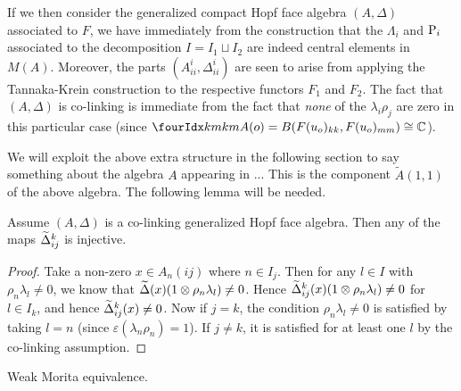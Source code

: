 If we then consider the generalized compact Hopf face algebra $(A,\Delta)$ associated to $F$, we have immediately from the construction that the $\Lambda_i$ and $\mathrm{P}_i$ associated to the decomposition $I = I_1\sqcup I_2$ are indeed central elements in $M(A)$. Moreover, the parts $(A_{ii}^i,\Delta_{ii}^i)$ are seen to arise from applying the Tannaka-Krein construction to the respective functors $F_1$ and $F_2$. The fact that $(A,\Delta)$ is co-linking is immediate from the fact that \emph{none} of the $\lambda_i\rho_j$ are zero in this particular case (since $\Gr{A}{k}{k}{m}{m}(o) = B(F(u_o)_{kk},F(u_o)_{mm}) \cong \C$).

We will exploit the above extra structure in the following section to say something about the algebra $A$ appearing in ... This is the component $\tilde{A}(1,1)$ of the above algebra. The following lemma will be needed.


\begin{Lem} Assume $(A,\Delta)$ is a co-linking generalized Hopf face algebra. Then any of the maps $\widetilde{\Delta}_{ij}^k$ is injective.\end{Lem}

\begin{proof} Take a non-zero $x\in A_n(ij)$ where $n\in I_j$. Then for any $l\in I$ with $\rho_n\lambda_l\neq 0$, we know that $\widetilde{\Delta}(x)(1\otimes \rho_n\lambda_l)\neq 0$. Hence $\widetilde{\Delta}_{ij}^k(x)(1\otimes \rho_n\lambda_l)\neq 0$ for $l\in I_k$, and hence $\widetilde{\Delta}_{ij}^k(x)\neq 0$. Now if $j=k$, the condition $\rho_n\lambda_l\neq 0$ is satisfied by taking $l=n$ (since $\varepsilon(\lambda_n\rho_n)=1$). If $j\neq k$, it is satisfied for at least one $l$ by the co-linking assumption.
\end{proof}



\begin{Exa} Weak Morita equivalence. 
\end{Exa}





